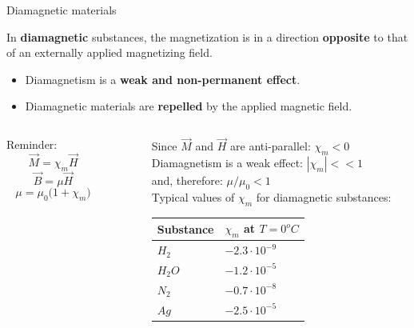 \begin{frame}{Diamagnetic materials}

In {\bf diamagnetic} substances, the magnetization is in a direction
{\bf opposite} to that of an externally applied magnetizing field.
\begin{itemize}
  \item Diamagnetism is a {\bf weak and non-permanent effect}.
  \item Diamagnetic materials are {\bf repelled} by the applied magnetic field.
\end{itemize}
\vspace{0.3cm}

\begin{columns}
  \begin{column}{0.25\textwidth}
   \begin{block}{}
     Reminder:
     \begin{equation*}
       \vec{M} = \chi_{m} \vec{H}
     \end{equation*}
     \begin{equation*}
       \vec{B} = \mu \vec{H}
     \end{equation*}
     \begin{equation*}
        \mu = \mu_0 \Big(1 + \chi_{m} \Big)
     \end{equation*}
   \end{block}
  \end{column}
  \begin{column}{0.05\textwidth}
  \end{column}
  \begin{column}{0.70\textwidth}
     Since $\vec{M}$ and $\vec{H}$ are anti-parallel: $\chi_{m} < 0$\\
     \vspace{0.2cm}
     Diamagnetism is a weak effect: $|\chi_{m}| << 1$\\
     and, therefore: $\mu / \mu_{0} < 1$\\
     \vspace{0.2cm}
     Typical values of $\chi_m$ for diamagnetic substances:
     \begin{center}
       \begin{table}[H]
         \begin{tabular}{|l|l|}
         \hline
           Substance &  $\chi_m$ at $T=0^{o}C$ \\
         \hline
           $H_{2}$  & $-2.3 \cdot 10^{-9}$ \\
           $H_{2}O$ & $-1.2 \cdot 10^{-5}$ \\
           $N_{2}$  & $-0.7 \cdot 10^{-8}$ \\
           $Ag$     & $-2.5 \cdot 10^{-5}$ \\
         \hline
         \end{tabular}
       \end{table}
     \end{center}
  \end{column}
\end{columns}

\end{frame}

